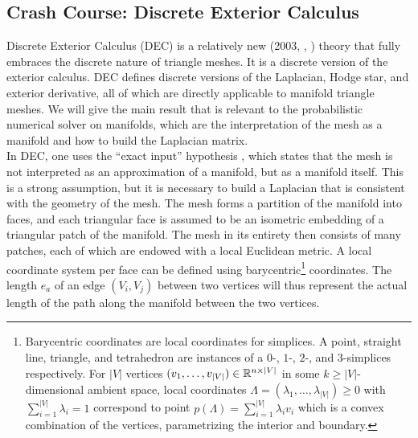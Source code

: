 \subsection*{Crash Course: Discrete Exterior Calculus}
Discrete Exterior Calculus (DEC) is a relatively new (2003, \cite{discrete_exterior_calculus_thesis}, \cite{discrete_exterior_calculus}) theory that fully embraces the discrete nature of triangle meshes. It is a discrete version of the exterior calculus. DEC defines discrete versions of the Laplacian, Hodge star, and exterior derivative, all of which are directly applicable to manifold triangle meshes. We will give the main result that is relevant to the probabilistic numerical solver on manifolds, which are the interpretation of the mesh as a manifold and how to build the Laplacian matrix. 
\\
In DEC, one uses the “exact input” hypothesis \cite{sharp2021intrinsic}, which states that the mesh is not interpreted as an approximation of a manifold, but as a manifold itself. This is a strong assumption, but it is necessary to build a Laplacian that is consistent with the geometry of the mesh. The mesh forms a partition of the manifold into faces, and each triangular face is assumed to be an isometric embedding of a triangular patch of the manifold. The mesh in its entirety then consists of many patches, each of which are endowed with a local Euclidean metric. A local coordinate system per face can be defined using barycentric\footnote{Barycentric coordinates are local coordinates for simplices. A point, straight line, triangle, and tetrahedron are instances of a $0$-, $1$-, $2$-, and $3$-simplices respectively. For $|V|$ vertices $(v_1, \dots, v_{|V|})\in \mathbb{R}^{n \times |V|}$ in some $k \geq |V|$-dimensional ambient space, local coordinates $\Lambda = (\lambda_1, \dots, \lambda_{|V|}) \geq 0$ with $\sum_{i=1}^{|V|} \lambda_i = 1$ correspond to point $p(\Lambda) = \sum_{i=1}^{|V|} \lambda_i v_i$ which is a convex combination of the vertices, parametrizing the interior and boundary.} coordinates.  The length $e_a$ of an edge $(V_i, V_j)$ between two vertices will thus represent the actual length of the path along the manifold between the two vertices.

